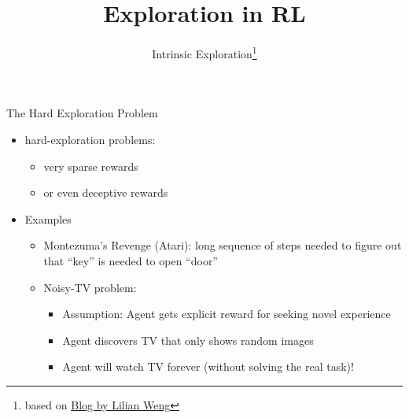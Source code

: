 


\title[RL: Exploration]{Exploration in RL}
\subtitle{Intrinsic Exploration\footnote{based on \href{https://lilianweng.github.io/lil-log/2020/06/07/exploration-strategies-in-deep-reinforcement-learning.html}{Blog by Lilian Weng}}}




	
	\maketitle

\begin{frame}[c]{The Hard Exploration Problem}
	
	\begin{itemize}
		\item hard-exploration problems:
		\begin{itemize}
			\item very sparse rewards 
			\item or even deceptive rewards
		\end{itemize}
		\medskip
		\pause
		\item Examples
		\begin{itemize}
			\item Montezuma's Revenge (Atari): long sequence of steps needed to figure out that ``key'' is needed to open ``door''
			\item Noisy-TV problem: 
			\begin{itemize}
				\item Assumption: Agent gets explicit reward for seeking novel experience
				\item Agent discovers TV that only shows random images
				\item Agent will watch TV forever (without solving the real task)!
			\end{itemize}
		\end{itemize}
	\end{itemize}

\end{frame}
